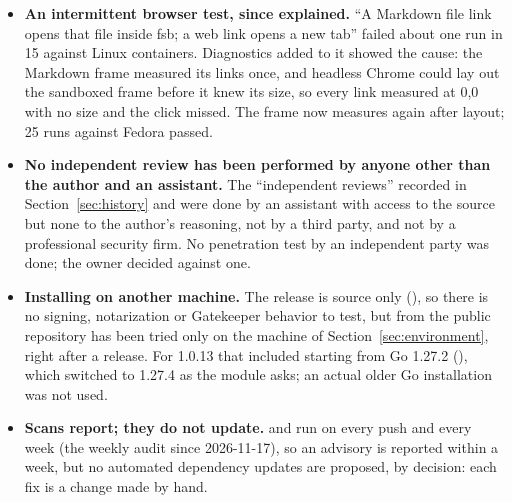 \begin{itemize}
        click tests and passed on a rerun.  For 1.0.12 (2026-10-09): 49 passed on the Mac
        and 50 against Debian, Ubuntu and Fedora; the first Alpine run failed one click
        test (the click never reached the Markdown frame) and passed 50 on a rerun.  Logs
        of each run are in .  1.0.7 to 1.0.10 were not run
        separately.  For 1.0.13, which changed only dependencies, Safari was not run;
        the Chrome suite was, on the Mac and against the four distributions
        (Section~\ref{sec:environment}).
  \item \textbf{An intermittent browser test, since explained.}  ``A Markdown file link
        opens that file inside fsb; a web link opens a new tab'' failed about one run in
        15 against Linux containers.  Diagnostics added to it showed the cause: the
        Markdown frame measured its links once, and headless Chrome could lay out the
        sandboxed frame before it knew its size, so every link measured at 0,0 with no
        size and the click missed.  The frame now measures again after layout; 25 runs
        against Fedora passed.
  \item \textbf{No independent review has been performed by anyone other than the
        author and an assistant.}  The ``independent reviews'' recorded in
        Section~\ref{sec:history} and  were done by an assistant
        with access to the source but none to the author's reasoning, not by a third
        party, and not by a professional security firm.  No penetration test by an
        independent party was done; the owner decided against one.
  \item \textbf{Installing on another machine.}  The release is source only
        (), so there is no signing, notarization or Gatekeeper behavior to test,
        but  from the public repository has been tried only on the
        machine of Section~\ref{sec:environment}, right after a release.  For 1.0.13 that
        included starting from Go 1.27.2 (), which
        switched to 1.27.4 as the module asks; an actual older Go installation was not
        used.
  \item \textbf{Scans report; they do not update.}   and  run on every push and every week (the weekly audit since 2026-11-17), so
        an advisory is reported within a week, but no automated dependency updates are
        proposed, by decision: each fix is a change made by hand.
\end{itemize}

